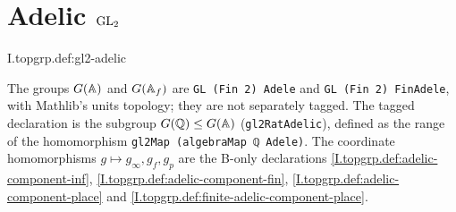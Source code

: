 \section{\texorpdfstring{Adelic $\GL_2$}{Adelic GL₂}}

\begin{definition}[adelic $\GL_2$]
\end{definition}
\begin{tfformal}{I.topgrp.def:gl2-adelic}
\begin{tffidelity}
The groups $G(\mathbb{A})$ and $G(\mathbb{A}_f)$ are \texttt{GL (Fin 2) Adele} and \texttt{GL (Fin 2) FinAdele}, with Mathlib's units topology; they are not separately tagged. The tagged declaration is the subgroup $G(\mathbb{Q})\le G(\mathbb{A})$ (\texttt{gl2RatAdelic}), defined as the range of the homomorphism \texttt{gl2Map (algebraMap ℚ Adele)}. The coordinate homomorphisms $g\mapsto g_\infty,g_f,g_p$ are the B-only declarations \cref{I.topgrp.def:adelic-component-inf}, \cref{I.topgrp.def:adelic-component-fin}, \cref{I.topgrp.def:adelic-component-place} and \cref{I.topgrp.def:finite-adelic-component-place}.
\end{tffidelity}
\end{tfformal}

